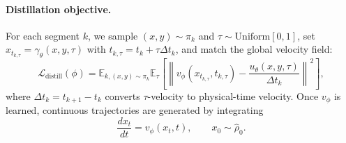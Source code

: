 \paragraph{Distillation objective.}
For each segment \(k\), we sample \((x,y)\sim\pi_k\) and \(\tau\sim\mathrm{Uniform}[0,1]\), set \(x_{t_{k,\tau}}=\gamma_\theta(x,y,\tau)\) with \(t_{k,\tau}=t_k+\tau\Delta t_k\), and match the global velocity field:
\begin{equation}
\label{eq:distill-loss}
\mathcal{L}_{\mathrm{distill}}(\phi)
=
\mathbb{E}_{k,(x,y)\sim\pi_k}
\mathbb{E}_{\tau}
\left[
\left\|
v_\phi(x_{t_{k,\tau}},t_{k,\tau})
-
\frac{u_\theta(x,y,\tau)}{\Delta t_k}
\right\|^2
\right],
\end{equation}
where \(\Delta t_k=t_{k+1}-t_k\) converts \(\tau\)-velocity to physical-time velocity.
Once \(v_\phi\) is learned, continuous trajectories are generated by integrating
\begin{equation}
\label{eq:global-ode}
\frac{dx_t}{dt}=v_\phi(x_t,t),
\qquad x_0\sim\hat\rho_0.
\end{equation}

